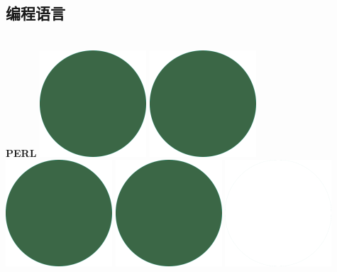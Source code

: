 \documentclass[a4paper]{friggeri-cv_reccius-experiment}
\begin{document}
\begin{aside}
  \section{编程语言}\\
    \vspace{1.7mm}
    \textbf{PERL}\hfill
    \includegraphics[scale=0.11]{img/IPSGreenDots.png}
    \includegraphics[scale=0.11]{img/IPSGreenDots.png}
    \includegraphics[scale=0.11]{img/IPSGreenDots.png}
    \includegraphics[scale=0.11]{img/IPSGreenDots.png}
    \includegraphics[scale=0.11]{img/WhiteDots.png}

\end{aside}
\end{document}
